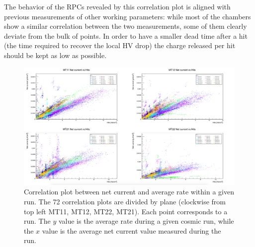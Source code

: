 The behavior of the RPCs revealed by this correlation plot is aligned with previous measurements of other working parameters: while most of the chambers show a similar correlation between the two measurements, some of them clearly deviate from the bulk of points.
In order to have a smaller dead time after a hit (the time required to recover the local HV drop) the charge released per hit should be kept as low as possible.

\begin{figure}[!t]
\begin{center}
\includegraphics[width=0.9\linewidth, angle =90]{Chapters/Performance/Figs/iNet_vs_rate.pdf}
\caption{Correlation plot between net current and average rate within a given run. The 72 correlation plots are divided by plane (clockwise from top left MT11, MT12, MT22, MT21). Each point corresponds to a run. The $y$ value is the average rate during a given cosmic run, while the $x$ value is the average net current value measured during the run.}
\label{fig:iNetvsRate4Planes}
\end{center}
\end{figure}

